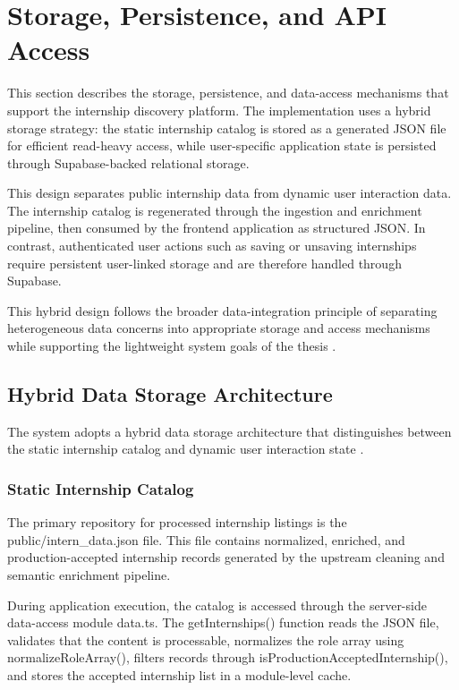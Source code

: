 \section{Storage, Persistence, and API Access}

This section describes the storage, persistence, and data-access mechanisms that support the internship discovery platform. The implementation uses a hybrid storage strategy: the static internship catalog is stored as a generated JSON file for efficient read-heavy access, while user-specific application state is persisted through Supabase-backed relational storage.

This design separates public internship data from dynamic user interaction data. The internship catalog is regenerated through the ingestion and enrichment pipeline, then consumed by the frontend application as structured JSON. In contrast, authenticated user actions such as saving or unsaving internships require persistent user-linked storage and are therefore handled through Supabase.

This hybrid design follows the broader data-integration principle of separating heterogeneous data concerns into appropriate storage and access mechanisms while supporting the lightweight system goals of the thesis \cite{chu2016data, menghani2023efficient}.

\subsection{Hybrid Data Storage Architecture}

The system adopts a hybrid data storage architecture that distinguishes between the static internship catalog and dynamic user interaction state \cite{kleppmann2017designing, codd1970relational}.

\subsubsection*{Static Internship Catalog}

The primary repository for processed internship listings is the public/intern\_data.json file. This file contains normalized, enriched, and production-accepted internship records generated by the upstream cleaning and semantic enrichment pipeline.

During application execution, the catalog is accessed through the server-side data-access module data.ts. The getInternships() function reads the JSON file, validates that the content is processable, normalizes the role array using normalizeRoleArray(), filters records through isProductionAcceptedInternship(), and stores the accepted internship list in a module-level cache.

